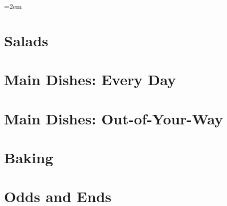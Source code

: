 \documentclass[landscape,12pt,openany]{book}
\begin{document}
\rmfamily

\setlength{\columnseprule}{0pt}
\columnsep=2em

\setcounter{tocdepth}{1}
\small
\tableofcontents

\normalsize

\setlength{\parskip}{.5em}

\chapter{Salads}











\chapter{Main Dishes: Every Day}



































\chapter{Main Dishes: Out-of-Your-Way}






\chapter{Baking}









\chapter{Odds and Ends}










\end{document}
